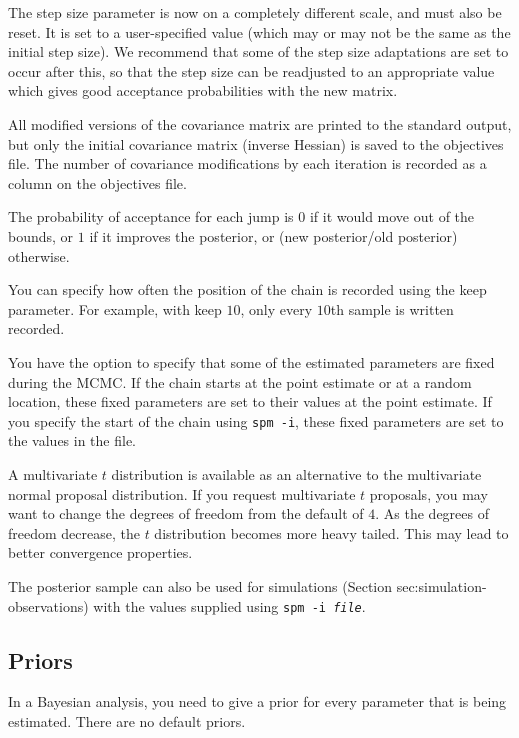 The step size parameter is now on a completely different scale, and must also be reset. It is set to a user-specified value (which may or may not be the same as the initial step size). We recommend that some of the step size adaptations are set to occur after this, so that the step size can be readjusted to an appropriate value which gives good acceptance probabilities with the new matrix. 

All modified versions of the covariance matrix are printed to the standard output, but only the initial covariance matrix (inverse Hessian) is saved to the objectives file. The number of covariance modifications by each iteration is recorded as a column on the objectives file. 

The probability of acceptance for each jump is $0$ if it would move out of the bounds, or $1$ if it improves the posterior, or (new posterior/old posterior) otherwise. 

You can specify how often the position of the chain is recorded using the keep parameter. For example, with keep $10$, only every $10$th sample is written recorded. 

You have the option to specify that some of the estimated parameters are fixed during the MCMC. If the chain starts at the point estimate or at a random location, these fixed parameters are set to their values at the point estimate. If you specify the start of the chain using \texttt{spm -i}, these fixed parameters are set to the values in the file.

A multivariate $t$ distribution is available as an alternative to the multivariate normal proposal distribution. If you request multivariate $t$ proposals, you may want to change the degrees of freedom from the default of $4$. As the degrees of freedom decrease, the $t$ distribution becomes more heavy tailed. This may lead to better convergence properties.

The posterior sample can also be used for %
simulations (Section {sec:simulation-observations}) with the values supplied using \texttt{spm -i \emph{file}}.

\subsection{Priors\label{sec:priors}}

In a Bayesian analysis, you need to give a prior for every parameter that is being estimated. There are no default priors.  

